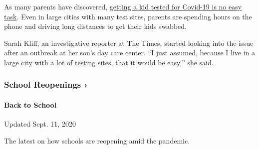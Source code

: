 As many parents have discovered,
\href{https://www.nytimes3xbfgragh.onion/2020/09/08/upshot/children-testing-shortfalls-virus.html}{getting
a kid tested for Covid-19 is no easy task}. Even in large cities with
many test sites, parents are spending hours on the phone and driving
long distances to get their kids swabbed.

Sarah Kliff, an investigative reporter at The Times, started looking
into the issue after an outbreak at her son's day care center. ``I just
assumed, because I live in a large city with a lot of testing sites,
that it would be easy,'' she said.

\href{https://www.nytimes3xbfgragh.onion/spotlight/schools-reopening?action=click\&pgtype=Article\&state=default\&region=MAIN_CONTENT_3\&context=storylines_keepup}{}

\hypertarget{school-reopenings-}{%
\subsubsection{School Reopenings ›}\label{school-reopenings-}}

\hypertarget{back-to-school}{%
\paragraph{Back to School}\label{back-to-school}}

Updated Sept. 11, 2020

The latest on how schools are reopening amid the pandemic.

